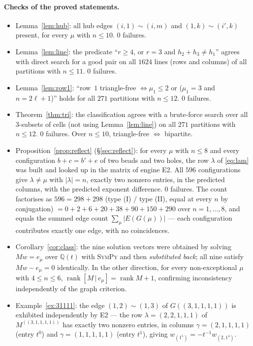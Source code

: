 \documentclass[11pt]{article}
\theoremstyle{definition}
\newcommand{\Q}{\mathbb{Q}}
\begin{document}
\paragraph{Checks of the proved statements.}
\begin{itemize}
\item Lemma~\ref{lem:hub}: all hub edges $(i,1)\sim(i,m)$ and $(1,k)\sim(i',k)$ present, for
      every $\mu$ with $n\le10$. $0$ failures.
\item Lemma~\ref{lem:line}: the predicate ``$r\ge4$, or $r=3$ and $h_2+h_3\ne h_1$'' agrees
      with direct search for a good pair on all $1624$ lines (rows and columns) of all
      partitions with $n\le11$. $0$ failures.
\item Lemma~\ref{lem:row1}: ``row~$1$ triangle-free $\iff\mu_1\le2$ or ($\mu_1=3$ and
      $n=2\ell+1$)'' holds for all $271$ partitions with $n\le12$. $0$ failures.
\item Theorem~\ref{thm:tri}: the classification agrees with a brute-force search over all
      $3$-subsets of cells (not using Lemma~\ref{lem:line}) on all $271$ partitions with
      $n\le12$. $0$ failures. Over $n\le10$, triangle-free $\iff$ bipartite.
\item Proposition~\ref{prop:reflect} (\S\ref{sec:reflect}): for every $\mu$ with $n\le8$
      and every configuration $b+c=b'+e$ of two beads and two holes, the row
      $\lambda$ of \eqref{eq:lam} was built and looked up in the matrix of engine E2. All
      $596$ configurations give $\lambda\ne\mu$ with $|\lambda|=n$, exactly two nonzero
      entries, in the predicted columns, with the predicted exponent difference. $0$
      failures. The count factorises as $596=298+298$ (type (I) / type (II), equal at every
      $n$ by conjugation) $=0+2+6+20+38+90+150+290$ over $n=1,\dots,8$, and equals the
      summed edge count $\sum_{\mu}|E(G(\mu))|$ --- each configuration contributes exactly
      one edge, with no coincidences.
\item Corollary~\ref{cor:class}: the nine solution vectors were obtained by solving
      $Mw=e_\mu$ over $\Q(t)$ with \textsc{SymPy} and then \emph{substituted back}; all nine
      satisfy $Mw-e_\mu=0$ identically. In the other direction, for every non-exceptional
      $\mu$ with $4\le n\le6$, $\operatorname{rank}[M\,|\,e_\mu]=\operatorname{rank}M+1$,
      confirming inconsistency independently of the graph criterion.
\item Example~\ref{ex:31111}: the edge $(1,2)\sim(1,3)$ of $G((3,1,1,1,1))$ is exhibited
      independently by E2 --- the row $\lambda=(2,2,1,1,1)$ of $M^{((3,1,1,1,1))}$ has exactly
      two nonzero entries, in columns $\gamma=(2,1,1,1,1)$ (entry $t^{0}$) and
      $\gamma=(1,1,1,1,1)$ (entry $t^{1}$), giving $w_{(1^5)}=-t^{-1}w_{(2,1^4)}$.
\end{itemize}
\end{document}

